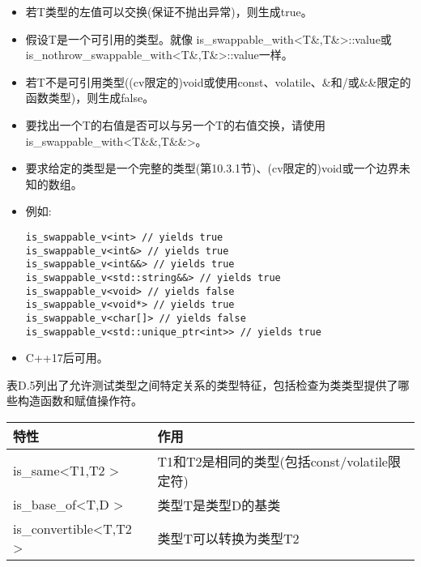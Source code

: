 \begin{itemize}
\item
若T类型的左值可以交换(保证不抛出异常)，则生成true。

\item
假设T是一个可引用的类型。就像 is\_swappable\_with<T\&,T\&>::value或is\_nothrow\_swappable\_with<T\&,T\&>::value一样。

\item
若T不是可引用类型((cv限定的)void或使用const、volatile、\&和/或\&\&限定的函数类型)，则生成false。

\item
要找出一个T的右值是否可以与另一个T的右值交换，请使用 is\_swappable\_with<T\&\&,T\&\&>。

\item
要求给定的类型是一个完整的类型(第10.3.1节)、(cv限定的)void或一个边界未知的数组。

\item
例如:
\begin{lstlisting}[style=styleCXX]
is_swappable_v<int> // yields true
is_swappable_v<int&> // yields true
is_swappable_v<int&&> // yields true
is_swappable_v<std::string&&> // yields true
is_swappable_v<void> // yields false
is_swappable_v<void*> // yields true
is_swappable_v<char[]> // yields false
is_swappable_v<std::unique_ptr<int>> // yields true
\end{lstlisting}

\item
C++17后可用。
\end{itemize}


表D.5列出了允许测试类型之间特定关系的类型特征，包括检查为类类型提供了哪些构造函数和赋值操作符。

\begin{table}[H]
	\begin{center}
	\begin{tabular}{l|l}
		\hline
		\textbf{特性}                                & \textbf{作用}                                                    \\ \hline
		is\_same\textless{}T1,T2 \textgreater{}       & T1和T2是相同的类型(包括const/volatile限定符)\\ \hline
		is\_base\_of\textless{}T,D \textgreater{}     & 类型T是类型D的基类                                     \\ \hline
		is\_convertible\textless{}T,T2 \textgreater{} & 类型T可以转换为类型T2                                 \\ \hline
	\end{tabular}
	\end{center}
\end{table}

